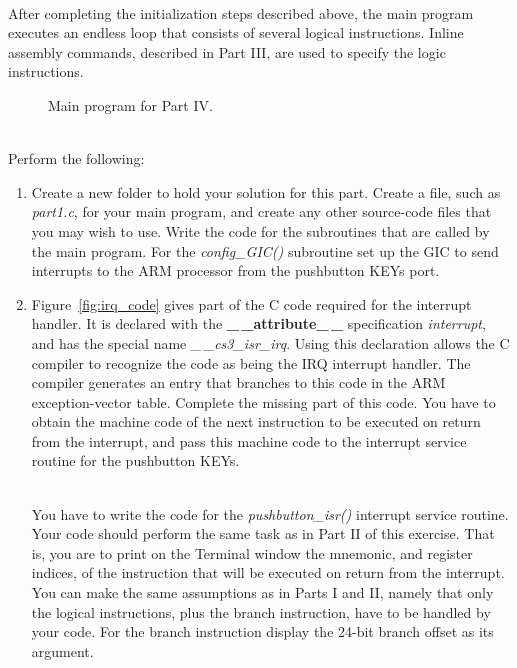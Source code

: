 \documentclass[epsfig,10pt,fullpage]{article}
\begin{document}
~\\
\noindent
After completing the initialization steps
described above, the main program executes an endless loop that consists of several
logical instructions. Inline assembly commands, described in Part III, are used to specify 
the logic instructions.

\clearpage
\begin{figure}[H]
\begin{center}

\end{center}
\caption{Main program for Part IV.}
\label{fig:C_code2}
\end{figure}

~\\
\noindent
Perform the following:

\begin{enumerate}
\item Create a new folder to hold your solution for this part. Create a
file, such as {\it part1.c}, for your main program, and create any other source-code files 
that you may wish to use.  Write the code for the subroutines that are called by the 
main program. For the {\it config\_GIC()} subroutine set up the
GIC to send interrupts to the ARM processor from the pushbutton KEYs port. 

\item 
Figure~\ref{fig:irq_code} gives part of the C code required for the interrupt handler. 
It is declared with the {\bf \_$\,$\_attribute\_$\,$\_} specification {\it interrupt}, 
and has the special name 
{\it \_$\,$\_cs3\_isr\_irq}.  Using this declaration allows the C compiler to recognize the 
code as being the IRQ interrupt handler. The compiler generates an entry that branches to
this code in the ARM exception-vector table. Complete the missing part of this code. You
have to obtain the machine code of the next instruction to be executed on return from the 
interrupt, and pass this machine code to the interrupt service routine for the
pushbutton KEYs.
  
~\\
You have to write the code for the {\it pushbutton\_isr()} interrupt service routine.
Your code should perform the same task as in Part II of this exercise. That is, you are to
print on the Terminal window the mnemonic, and register indices, of the instruction that 
will be executed on return from the interrupt. You can make the same assumptions as in
Parts I and II, namely that only the logical instructions, plus the branch instruction,
have to be handled by your code. For the branch instruction display the 24-bit branch
offset as its argument.


\end{enumerate}
\end{document}
